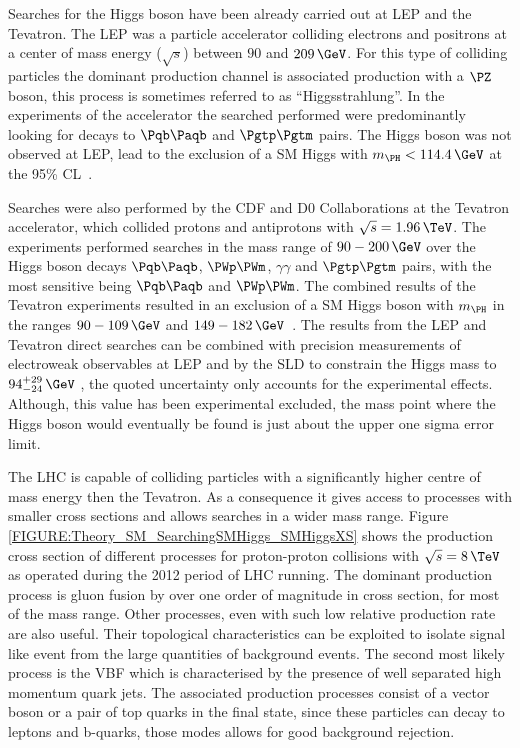 Searches for the Higgs boson have been already carried out at \gls{LEP} and the Tevatron. The \gls{LEP} was a particle accelerator colliding electrons and positrons at a center of mass energy ($\sqrt{s}$) between $90$ and $209\,\GeV$. For this type of colliding particles the dominant production channel is associated production with a $\PZ$ boson, this process is sometimes referred to as ``Higgsstrahlung''. In the experiments of the accelerator the searched performed were predominantly looking for decays to $\Pqb\Paqb$ and $\Pgtp\Pgtm$ pairs. The Higgs boson was not observed at \gls{LEP}, lead to the exclusion of a \gls{SM} Higgs with $m_{\PH}<114.4\,\GeV$ at the 95\% \gls{CL}~\cite{ARTICLE:LEPWorkingGroupforHiggsBosonSearches}.

Searches were also performed by the CDF and D0 Collaborations at the Tevatron accelerator, which collided protons and antiprotons with $\sqrt{s}=1.96\,\TeV$. The experiments performed searches in the mass range of $90-200\,\GeV$ over the Higgs boson decays $\Pqb\Paqb$, $\PWp\PWm$, $\gamma\gamma$ and $\Pgtp\Pgtm$ pairs, with the most sensitive being $\Pqb\Paqb$ and $\PWp\PWm$. The combined results of the Tevatron experiments resulted in an exclusion of a \gls{SM} Higgs boson with $m_{\PH}$ in the ranges $90-109\,\GeV$ and $149-182\,\GeV$~\cite{ARTICLE:CDFDOHiggsBosonStudies}. The results from the \gls{LEP} and Tevatron direct searches can be combined with precision measurements of electroweak observables at \gls{LEP} and by the \gls{SLD} to constrain the Higgs mass to $94^{+29}_{-24}\,\GeV$ \cite{SITE:lepewwg}, the quoted uncertainty only accounts for the experimental effects. Although, this value has been experimental excluded, the mass point where the Higgs boson would eventually be found is just about the upper one sigma error limit.

The \gls{LHC} is capable of colliding particles with a significantly higher centre of mass energy then the Tevatron. As a consequence it gives access to processes with smaller cross sections and allows searches in a wider mass range. Figure \ref{FIGURE:Theory_SM_SearchingSMHiggs_SMHiggsXS} shows the production cross section of different processes for proton-proton collisions with $\sqrt{s}=8\,\TeV$ as operated during the 2012 period of \gls{LHC} running. The dominant production process is  gluon fusion by over one order of magnitude in cross section, for most of the mass range. Other processes, even with such low relative production rate are also useful. Their topological characteristics can be exploited to isolate signal like event from the large quantities of background events. The second most likely process is the \gls{VBF} which is characterised by the presence of well separated high momentum quark jets. The associated production processes consist of a vector boson or a pair of top quarks in the final state, since these particles can decay to leptons and b-quarks, those modes allows for good background rejection. 

